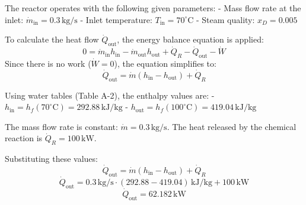 The reactor operates with the following given parameters:  
- Mass flow rate at the inlet: \( \dot{m}_{\text{in}} = 0.3 \, \text{kg/s} \)  
- Inlet temperature: \( T_{\text{in}} = 70^\circ\text{C} \)  
- Steam quality: \( x_D = 0.005 \)  

To calculate the heat flow \( \dot{Q}_{\text{out}} \), the energy balance equation is applied:  
\[
0 = \dot{m}_{\text{in}} h_{\text{in}} - \dot{m}_{\text{out}} h_{\text{out}} + \dot{Q}_R - \dot{Q}_{\text{out}} - \dot{W}
\]  
Since there is no work (\( \dot{W} = 0 \)), the equation simplifies to:  
\[
\dot{Q}_{\text{out}} = \dot{m} (h_{\text{in}} - h_{\text{out}}) + \dot{Q}_R
\]  

Using water tables (Table A-2), the enthalpy values are:  
- \( h_{\text{in}} = h_f(70^\circ\text{C}) = 292.88 \, \text{kJ/kg} \)  
- \( h_{\text{out}} = h_f(100^\circ\text{C}) = 419.04 \, \text{kJ/kg} \)  

The mass flow rate is constant: \( \dot{m} = 0.3 \, \text{kg/s} \).  
The heat released by the chemical reaction is \( \dot{Q}_R = 100 \, \text{kW} \).  

Substituting these values:  
\[
\dot{Q}_{\text{out}} = \dot{m} (h_{\text{in}} - h_{\text{out}}) + \dot{Q}_R
\]  
\[
\dot{Q}_{\text{out}} = 0.3 \, \text{kg/s} \cdot (292.88 - 419.04) \, \text{kJ/kg} + 100 \, \text{kW}
\]  
\[
\dot{Q}_{\text{out}} = 62.182 \, \text{kW}
\]